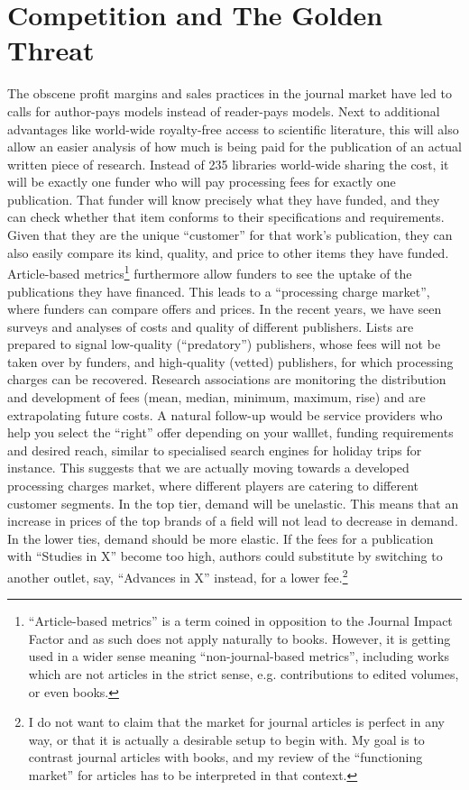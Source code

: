 \documentclass[12pt]{article}
\begin{document}
\section{Competition and The Golden Threat}\label{sec:goldenthreat}
The obscene profit margins and sales practices in the journal market have led to calls for author-pays models instead of reader-pays models. Next to additional advantages like world-wide royalty-free access to scientific literature, this will also allow an easier analysis of how much is being paid for the publication of an actual written piece of research. Instead of 235 libraries world-wide sharing the cost, it will be exactly one funder who will pay processing fees for exactly one publication. That funder will know precisely what they have funded, and they can check whether that item conforms to their specifications and requirements. Given that they are the unique ``customer'' for that work's publication, they can also easily compare its kind, quality, and price to other items they have funded. Article-based metrics\footnote{``Article-based metrics''
 is a term coined in opposition to the Journal Impact Factor and as such does not apply naturally to books. However, it is getting used in a wider sense meaning ``non-journal-based metrics'', including works which are not articles in the strict sense, e.g. contributions to edited volumes, or even books.
 } furthermore allow funders to see the uptake of the publications they have financed. This leads to a ``processing charge market'', where funders can compare offers and prices. In the recent years, we have seen surveys and analyses of costs and quality of different publishers. Lists are prepared to signal low-quality (``predatory'') publishers, whose fees will not be taken over by funders,  and high-quality (vetted) publishers, for which processing charges can be recovered. Research associations are monitoring the distribution and development of fees (mean, median, minimum, maximum, rise) %
 and are extrapolating future costs. A natural follow-up would be service providers who help you select the ``right'' offer depending on your walllet, funding requirements and desired reach, similar to specialised search engines for holiday trips for instance. This suggests that we are actually moving towards a developed processing charges market, where different players are catering to different customer segments. In the top tier, demand will be unelastic. This means that an increase in prices of the top brands of a field will not lead to decrease in demand.  In the lower ties, demand should be more elastic. If the fees for a publication with ``Studies in X'' become too high, authors could substitute by switching to another outlet, say, ``Advances in X'' instead, for a lower fee.\footnote{I do not want to claim that the market for journal articles is perfect in any way, or that it is actually a desirable setup to begin with. My goal is to contrast journal articles with books, and my review of the ``functioning market'' for articles has to be interpreted in that context.} 
 
\end{document}
